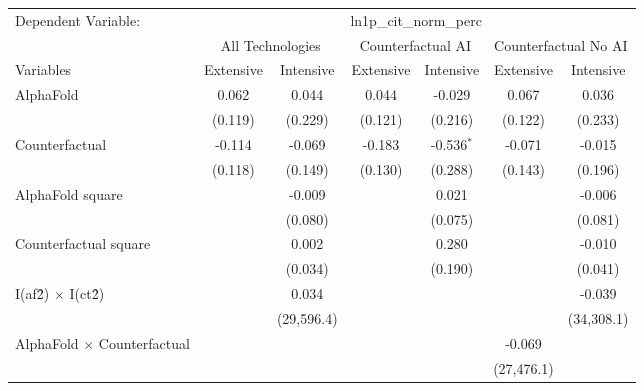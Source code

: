 \begingroup
\centering
\begin{tabular}{lcccccc}
   \tabularnewline \midrule \midrule
   Dependent Variable: & \multicolumn{6}{c}{ln1p\_cit\_norm\_perc}\\
 & \multicolumn{2}{c}{All Technologies} & \multicolumn{2}{c}{Counterfactual AI} & \multicolumn{2}{c}{Counterfactual No AI} \\
\cmidrule(lr){1-1}\cmidrule(lr){2-3} \cmidrule(lr){4-5} \cmidrule(lr){6-7}
Variables & \multicolumn{1}{c}{Extensive} & \multicolumn{1}{c}{Intensive} & \multicolumn{1}{c}{Extensive} & \multicolumn{1}{c}{Intensive} & \multicolumn{1}{c}{Extensive} & \multicolumn{1}{c}{Intensive} \\
\cmidrule(lr){1-1}\cmidrule(lr){2-2} \cmidrule(lr){3-3} \cmidrule(lr){4-4} \cmidrule(lr){5-5} \cmidrule(lr){6-6} \cmidrule(lr){7-7}
   AlphaFold                          & 0.062   & 0.044      & 0.044   & -0.029       & 0.067      & 0.036\\   
                                      & (0.119) & (0.229)    & (0.121) & (0.216)      & (0.122)    & (0.233)\\   
   Counterfactual                     & -0.114  & -0.069     & -0.183  & -0.536$^{*}$ & -0.071     & -0.015\\   
                                      & (0.118) & (0.149)    & (0.130) & (0.288)      & (0.143)    & (0.196)\\   
   AlphaFold square                   &         & -0.009     &         & 0.021        &            & -0.006\\   
                                      &         & (0.080)    &         & (0.075)      &            & (0.081)\\   
   Counterfactual square              &         & 0.002      &         & 0.280        &            & -0.010\\   
                                      &         & (0.034)    &         & (0.190)      &            & (0.041)\\   
   I(af\^2) $\times$ I(ct\^2)         &         & 0.034      &         &              &            & -0.039\\   
                                      &         & (29,596.4) &         &              &            & (34,308.1)\\   
   AlphaFold $\times$ Counterfactual  &         &            &         &              & -0.069     &   \\   
                                      &         &            &         &              & (27,476.1) &   \\   

\end{tabular}
